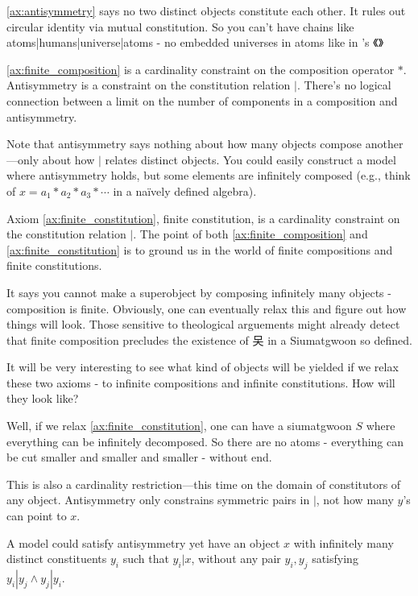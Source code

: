 \ref{ax:antisymmetry} says no two distinct objects constitute each other. It rules out circular identity via mutual constitution. So you can't have chains like atoms|humans|universe|atoms - no embedded universes in atoms like in 's 《》 

\ref{ax:finite_composition} is a cardinality constraint on the composition operator $*$. Antisymmetry is a constraint on the constitution relation $|$. There's no logical connection between a limit on the number of components in a composition and antisymmetry.

Note that antisymmetry says nothing about how many objects compose another—only about how $|$ relates distinct objects. You could easily construct a model where antisymmetry holds, but some elements are infinitely composed (e.g., think of $x = a_1 * a_2 * a_3 * \cdots$ in a naïvely defined algebra).

Axiom \ref{ax:finite_constitution}, finite constitution, is a cardinality constraint on the constitution relation $|$. The point of both \ref{ax:finite_composition} and \ref{ax:finite_constitution} is to ground us in the world of finite compositions and finite constitutions. 

It says you cannot make a superobject by composing infinitely many objects - composition is finite. Obviously, one can eventually relax this and figure out how things will look. Those sensitive to theological arguements might already detect that finite composition precludes the existence of 㕦 in a Siumatgwoon so defined.

It will be very interesting to see what kind of objects will be yielded if we relax these two axioms - to infinite compositions and infinite constitutions. How will they look like?

Well, if we relax \ref{ax:finite_constitution}, one can have a siumatgwoon $S$ where everything can be infinitely decomposed. So there are no atoms - everything can be cut smaller and smaller and smaller - without end.

This is also a cardinality restriction—this time on the domain of constitutors of any object. Antisymmetry only constrains symmetric pairs in $|$, not how many $y$'s can point to $x$.

A model could satisfy antisymmetry yet have an object $x$ with infinitely many distinct constituents $y_i$ such that $y_i|x$, without any pair $y_i, y_j$ satisfying $y_i|y_j \wedge y_j|y_i$.

